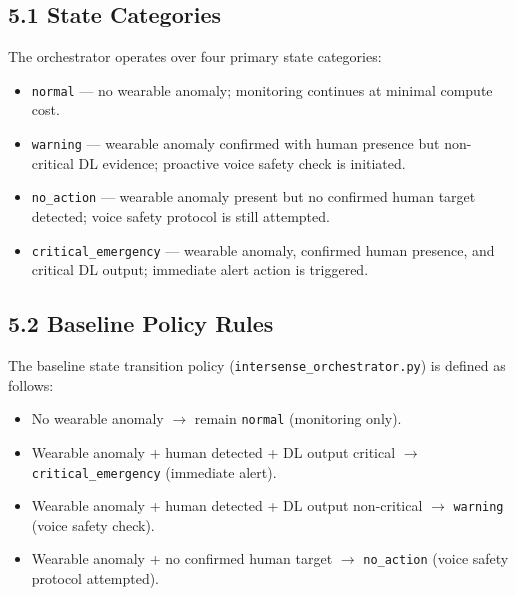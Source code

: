 \documentclass[11pt,a4paper]{article}
\begin{document}
\subsection{5.1 State Categories}
The orchestrator operates over four primary state categories:
\begin{itemize}[leftmargin=1.4em]
  \item \texttt{normal} — no wearable anomaly; monitoring continues at minimal compute cost.
  \item \texttt{warning} — wearable anomaly confirmed with human presence but non-critical DL evidence; proactive voice safety check is initiated.
  \item \texttt{no\_action} — wearable anomaly present but no confirmed human target detected; voice safety protocol is still attempted.
  \item \texttt{critical\_emergency} — wearable anomaly, confirmed human presence, and critical DL output; immediate alert action is triggered.
\end{itemize}

\subsection{5.2 Baseline Policy Rules}
The baseline state transition policy (\texttt{intersense\_orchestrator.py}) is defined as follows:
\begin{itemize}[leftmargin=1.4em]
  \item No wearable anomaly $\rightarrow$ remain \texttt{normal} (monitoring only).
  \item Wearable anomaly + human detected + DL output critical $\rightarrow$ \texttt{critical\_emergency} (immediate alert).
  \item Wearable anomaly + human detected + DL output non-critical $\rightarrow$ \texttt{warning} (voice safety check).
  \item Wearable anomaly + no confirmed human target $\rightarrow$ \texttt{no\_action} (voice safety protocol attempted).
\end{itemize}
\end{document}
